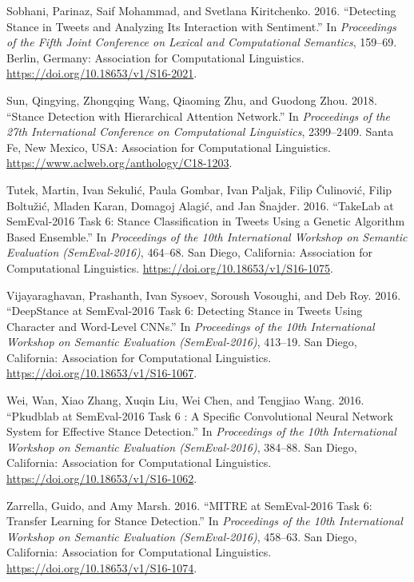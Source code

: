 \documentclass[]{article}
\begin{document}
\leavevmode\hypertarget{ref-sobhani-etal-2016-detecting}{}%
Sobhani, Parinaz, Saif Mohammad, and Svetlana Kiritchenko. 2016.
``Detecting Stance in Tweets and Analyzing Its Interaction with
Sentiment.'' In \emph{Proceedings of the Fifth Joint Conference on
Lexical and Computational Semantics}, 159--69. Berlin, Germany:
Association for Computational Linguistics.
\url{https://doi.org/10.18653/v1/S16-2021}.

\leavevmode\hypertarget{ref-sun-etal-2018-stance}{}%
Sun, Qingying, Zhongqing Wang, Qiaoming Zhu, and Guodong Zhou. 2018.
``Stance Detection with Hierarchical Attention Network.'' In
\emph{Proceedings of the 27th International Conference on Computational
Linguistics}, 2399--2409. Santa Fe, New Mexico, USA: Association for
Computational Linguistics.
\url{https://www.aclweb.org/anthology/C18-1203}.

\leavevmode\hypertarget{ref-tutek-etal-2016-takelab}{}%
Tutek, Martin, Ivan Sekulić, Paula Gombar, Ivan Paljak, Filip Čulinović,
Filip Boltužić, Mladen Karan, Domagoj Alagić, and Jan Šnajder. 2016.
``TakeLab at SemEval-2016 Task 6: Stance Classification in Tweets Using
a Genetic Algorithm Based Ensemble.'' In \emph{Proceedings of the 10th
International Workshop on Semantic Evaluation (SemEval-2016)}, 464--68.
San Diego, California: Association for Computational Linguistics.
\url{https://doi.org/10.18653/v1/S16-1075}.

\leavevmode\hypertarget{ref-vijayaraghavan-etal-2016-deepstance}{}%
Vijayaraghavan, Prashanth, Ivan Sysoev, Soroush Vosoughi, and Deb Roy.
2016. ``DeepStance at SemEval-2016 Task 6: Detecting Stance in Tweets
Using Character and Word-Level CNNs.'' In \emph{Proceedings of the 10th
International Workshop on Semantic Evaluation (SemEval-2016)}, 413--19.
San Diego, California: Association for Computational Linguistics.
\url{https://doi.org/10.18653/v1/S16-1067}.

\leavevmode\hypertarget{ref-wei-etal-2016-pkudblab}{}%
Wei, Wan, Xiao Zhang, Xuqin Liu, Wei Chen, and Tengjiao Wang. 2016.
``Pkudblab at SemEval-2016 Task 6 : A Specific Convolutional Neural
Network System for Effective Stance Detection.'' In \emph{Proceedings of
the 10th International Workshop on Semantic Evaluation (SemEval-2016)},
384--88. San Diego, California: Association for Computational
Linguistics. \url{https://doi.org/10.18653/v1/S16-1062}.

\leavevmode\hypertarget{ref-zarrella-marsh-2016-mitre}{}%
Zarrella, Guido, and Amy Marsh. 2016. ``MITRE at SemEval-2016 Task 6:
Transfer Learning for Stance Detection.'' In \emph{Proceedings of the
10th International Workshop on Semantic Evaluation (SemEval-2016)},
458--63. San Diego, California: Association for Computational
Linguistics. \url{https://doi.org/10.18653/v1/S16-1074}.
\end{document}
